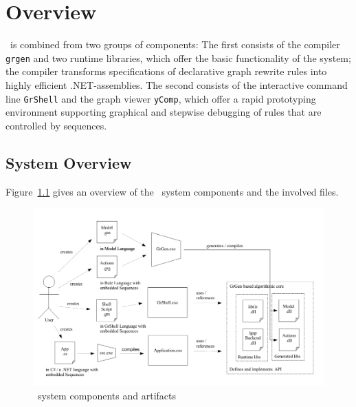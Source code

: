 \chapter{Overview}
\label{chp:overview}

\GrG\ is combined from two groups of components:
The first consists of the compiler \texttt{grgen} and two runtime libraries, which offer the basic functionality of the system;
the compiler transforms specifications of declarative graph rewrite rules into highly efficient .NET-assemblies.
The second consists of the interactive command line \texttt{GrShell} and the graph viewer \texttt{yComp},
which offer a rapid prototyping environment supporting graphical and stepwise debugging of rules that are controlled by sequences.

\section{System Overview}\label{systemoverview}

Figure~\ref{figsys} gives an overview of the \GrG\ system components and the involved files.

\begin{figure}[htbp]
  \centering
  \includegraphics[width=\textwidth]{fig/OverviewGenerationArtefacts}
  \caption{\GrG\ system components and artifacts}
  \label{figsys}
\end{figure}

